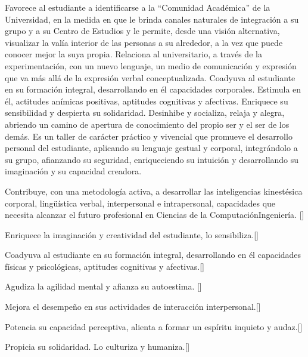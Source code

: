 \begin{syllabus}


\begin{justification}
Favorece al estudiante a identificarse a la ``Comunidad Académica'' de la Universidad, en la medida en que le brinda canales naturales de integración a su grupo y  a su Centro de Estudios y le permite,  desde una visión alternativa, visualizar la valía interior de las personas a su alrededor, a la vez que puede conocer mejor la suya propia. 
Relaciona al universitario, a través de la experimentación, con un nuevo lenguaje, un medio de comunicación y expresión que va más allá de la expresión verbal conceptualizada.
Coadyuva al estudiante en su formación integral, desarrollando en él  capacidades corporales. Estimula en él, actitudes anímicas positivas,  aptitudes cognitivas y afectivas. Enriquece su sensibilidad y despierta su solidaridad.    
Desinhibe y socializa, relaja y alegra,  abriendo un camino de apertura de conocimiento del propio ser y el ser de los demás.
Es un taller de carácter práctico y vivencial que promueve el desarrollo personal del estudiante, aplicando su lenguaje gestual y corporal, integrándolo a su grupo, afianzando su seguridad,  enriqueciendo su intuición y desarrollando su imaginación y su capacidad creadora.
\end{justification}

\begin{goals}
	\item Contribuye, con una metodología activa, a desarrollar las inteligencias kinestésica corporal, lingüística verbal, interpersonal e intrapersonal, capacidades que necesita alcanzar el futuro profesional en Ciencias de la ComputaciónIngeniería. [\Usge]
	\item Enriquece la imaginación y creatividad del estudiante, lo sensibiliza.[\Usage]
	\item Coadyuva al estudiante en su formación integral, desarrollando en él  capacidades físicas y psicológicas, aptitudes cognitivas y afectivas.[\Usage]
	\item Agudiza  la agilidad mental y afianza su autoestima. [\Usage]
	\item Mejora el desempeño en sus actividades de interacción interpersonal.[\Usage]
	\item Potencia su capacidad perceptiva, alienta a formar un espíritu inquieto y audaz.[\Usage]
	\item Propicia  su solidaridad. Lo culturiza y humaniza.[\Usage]
\end{goals}


\end{syllabus}
